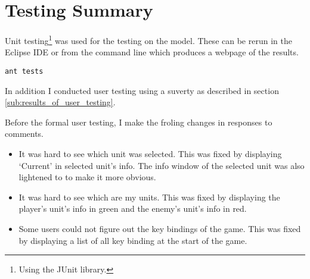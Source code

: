 \section{Testing Summary}

Unit testing\footnote{Using the JUnit library.} was used for the testing on the model. These can be rerun in the Eclipse IDE or from the command line which produces a webpage of the results.

\begin{lstlisting}[caption=Commend to make a webpage of the result of the unit testing]
	ant tests
\end{lstlisting}

In addition I conducted user testing using a suverty as described in section \ref{sub:results_of_user_testing}. 

Before the formal user testing, I make the froling changes in responses to comments. 

\begin{itemize}
	\item It was hard to see which unit was selected. This was fixed by  displaying `Current' in selected unit's info. The info window of the selected unit was also lightened to to make it more obvious.
	
	\item It was hard to see which are my units. This was fixed by displaying the player's unit's info in green and the enemy's unit's info in red. 
	
	\item Some users could not figure out the key bindings of the game. This was fixed by displaying a list of all key binding at the start of the game.
\end{itemize}
